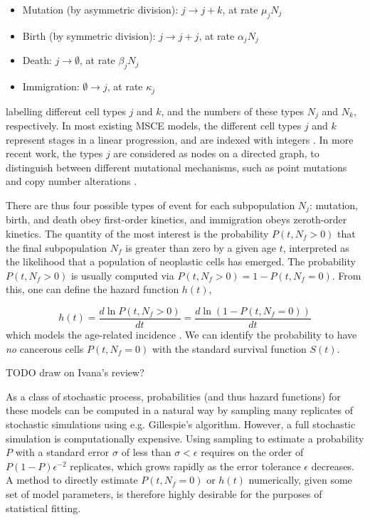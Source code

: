 \documentclass{article}
\begin{document}
\begin{itemize}
    \item Mutation (by asymmetric division): $j \rightarrow j + k$, at rate
    $\mu_j N_j$
    \item Birth (by symmetric division): $j \rightarrow j + j$, at rate
    $\alpha_j N_j$
    \item Death: $j \rightarrow \emptyset$, at rate $\beta_j N_j$
    \item Immigration: $\emptyset \rightarrow j$, at rate $\kappa_j$
\end{itemize}
labelling different cell types $j$ and $k$, and the numbers of these types $N_j$
and $N_k$, respectively. In most existing MSCE models, the different cell types $j$
and $k$ represent stages in a linear progression, and are indexed with
integers \cite{moolgavkar1992multistage,luebeck2013impact}. In more recent work,
the types $j$ are considered as nodes on a directed graph, to distinguish
between different mutational mechanisms, such as point mutations and copy number
alterations \cite{patersonbozic2020colorectal,Paterson2021vs}.


There are thus four possible types of event for each subpopulation $N_j$: mutation,
birth, and death obey first-order kinetics, and immigration obeys zeroth-order
kinetics. The quantity of the most interest is
the probability $P(t,N_f > 0)$ that the final subpopulation $N_f$ is greater than
zero by a given age
$t$, interpreted as the likelihood that a population of neoplastic cells has emerged.
The probability $P(t,N_f > 0)$ is usually computed via $P(t,N_f > 0) = 1 - P(t,N_f = 0)$.
From this, one can define the hazard function $h(t)$,

\begin{equation}
    h(t) = \frac{d \ln P(t,N_f > 0)}{dt} = \frac{d \ln(1 - P(t,N_f = 0))}{dt}
\end{equation}
which models the age-related incidence \cite{luebeck2013impact}. We can
identify the probability to have \emph{no} cancerous cells $P(t,N_f = 0)$ with
the standard survival function $S(t)$.

TODO draw on Ivana's review?

As a class of stochastic process, probabilities (and thus hazard functions) for 
these models can be computed in a natural way by sampling many replicates of 
stochastic simulations using e.g. Gillespie's algorithm. However, a full
stochastic simulation is computationally expensive. Using sampling to estimate 
a probability $P$ with a standard error $\sigma$ of less than $\sigma < \epsilon$ 
requires on the order of
$P (1 - P) \epsilon^{-2}$ replicates, which grows rapidly as the error tolerance $\epsilon$
decreases.
A method to directly estimate $P(t,N_f = 0)$ or $h(t)$ numerically, given some
set of model parameters, is therefore highly desirable for the purposes of
statistical fitting. 
\end{document}
